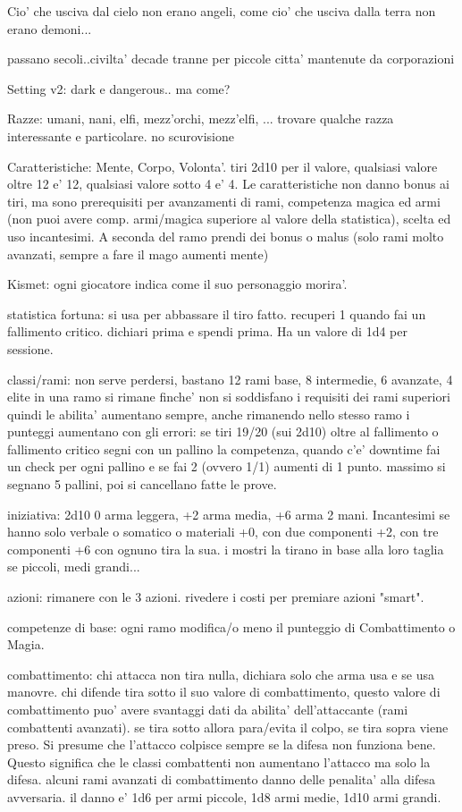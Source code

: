 \documentclass[12pt,a4paper,twoside,openany,twocolumn]{book}
\begin{document}
Cio' che usciva dal cielo non erano angeli, come cio' che usciva dalla terra non erano demoni...

passano secoli..civilta' decade tranne per piccole citta' mantenute da corporazioni


Setting v2: dark e dangerous.. ma come?


Razze: umani, nani, elfi, mezz'orchi, mezz'elfi, ... trovare qualche razza interessante e particolare. no scurovisione

Caratteristiche: Mente, Corpo, Volonta'. tiri 2d10 per il valore, qualsiasi valore oltre 12 e' 12, qualsiasi valore sotto 4 e' 4.
Le caratteristiche non danno bonus ai tiri, ma sono prerequisiti per avanzamenti di rami, competenza magica ed armi (non puoi avere comp. armi/magica superiore al valore della statistica), scelta ed uso incantesimi. A seconda del ramo prendi dei bonus o malus (solo rami molto avanzati, sempre a fare il mago aumenti mente)


Kismet: ogni giocatore indica come il suo personaggio morira'.

statistica fortuna: si usa per abbassare il tiro fatto. recuperi 1 quando fai un fallimento critico. dichiari prima e spendi prima.
Ha un valore di 1d4 per sessione.

classi/rami: non serve perdersi, bastano 12 rami base, 8 intermedie, 6 avanzate, 4 elite
in una ramo si rimane finche' non si soddisfano i requisiti dei rami superiori
quindi le abilita' aumentano sempre, anche rimanendo nello stesso ramo
i punteggi aumentano con gli errori: se tiri 19/20 (sui 2d10) oltre al fallimento o fallimento critico segni con un pallino la competenza, quando c'e' downtime fai un check per ogni pallino e se fai 2 (ovvero 1/1) aumenti di 1 punto. massimo si segnano 5 pallini, poi si cancellano fatte le prove.

iniziativa: 2d10 0 arma leggera, +2 arma media, +6 arma 2 mani. Incantesimi se hanno solo verbale o somatico o materiali +0, con due componenti +2, con tre componenti +6 con ognuno tira la sua. i mostri la tirano in base alla loro taglia se piccoli, medi grandi...

azioni: rimanere con le 3 azioni. rivedere i costi per premiare azioni "smart". 

competenze di base: ogni ramo modifica/o meno il punteggio di Combattimento o Magia.

combattimento: chi attacca non tira nulla, dichiara solo che arma usa e se usa manovre. chi difende tira sotto il suo valore di combattimento, questo valore di combattimento puo' avere svantaggi dati da abilita' dell'attaccante (rami combattenti avanzati). se tira sotto allora para/evita il colpo, se tira sopra viene preso.
Si presume che l'attacco colpisce sempre se la difesa non funziona bene. Questo significa che le classi combattenti non aumentano l'attacco ma solo la difesa. alcuni rami avanzati di combattimento danno delle penalita' alla difesa avversaria.
il danno e' 1d6 per armi piccole, 1d8 armi medie, 1d10 armi grandi. 
\end{document}
